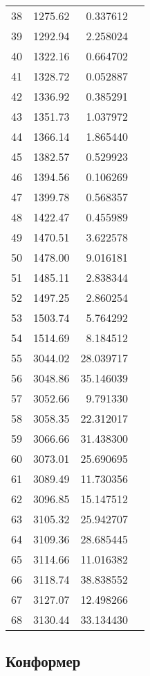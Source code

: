 \begin{tabular}{r|rr|l}
38 &     1275.62  &  0.337612  & \\
39 &     1292.94  &  2.258024  & \\
40 &     1322.16  &  0.664702  & \\
41 &     1328.72  &  0.052887  & \\
42 &     1336.92  &  0.385291  & \\
43 &     1351.73  &  1.037972  & \\
44 &     1366.14  &  1.865440  & \\
45 &     1382.57  &  0.529923  & \\
46 &     1394.56  &  0.106269  & \\
47 &     1399.78  &  0.568357  & \\
48 &     1422.47  &  0.455989  & \\
49 &     1470.51  &  3.622578  & \\
50 &     1478.00  &  9.016181  & \\
51 &     1485.11  &  2.838344  & \\
52 &     1497.25  &  2.860254  & \\
53 &     1503.74  &  5.764292  & \\
54 &     1514.69  &  8.184512  & \\
55 &     3044.02  & 28.039717  & \\
56 &     3048.86  & 35.146039  & \\
57 &     3052.66  &  9.791330  & \\
58 &     3058.35  & 22.312017  & \\
59 &     3066.66  & 31.438300  & \\
60 &     3073.01  & 25.690695  & \\
61 &     3089.49  & 11.730356  & \\
62 &     3096.85  & 15.147512  & \\
63 &     3105.32  & 25.942707  & \\
64 &     3109.36  & 28.685445  & \\
65 &     3114.66  & 11.016382  & \\
66 &     3118.74  & 38.838552  & \\
67 &     3127.07  & 12.498266  & \\
68 &     3130.44  & 33.134430  & \\
  \bottomrule
  \end{tabular}
\normalsize

\subsection{Конформер \CC{}}

